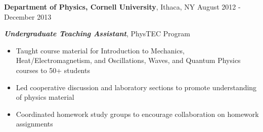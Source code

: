 
\vspace{7pt}

\textbf{Department of Physics, Cornell University}, Ithaca, NY \hfill August 2012 - December 2013

\textbf{\textit{Undergraduate Teaching Assistant}}, PhysTEC Program

\begin{itemize}
    \item Taught course material for Introduction to Mechanics, Heat/Electromagnetism, and Oscillations, Waves, and Quantum Physics courses to 50+ students
    \item Led cooperative discussion and laboratory sections to promote understanding of physics material
    \item Coordinated homework study groups to encourage collaboration on homework assignments
\end{itemize}
